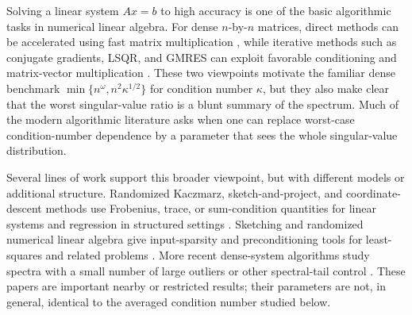 \documentclass[11pt]{article}
\begin{document}
Solving a linear system $Ax=b$ to high accuracy is one of the basic algorithmic
tasks in numerical linear algebra.  For dense $n$-by-$n$ matrices, direct
methods can be accelerated using fast matrix multiplication
\cite{Strassen1969GaussianElimination,BunchHopcroft1974FastMatrixInversion,AlmanEtAl2025MoreAsymmetry},
while iterative methods such as conjugate gradients, LSQR, and GMRES
\cite{HestenesStiefel1952ConjugateGradient,PaigeSaunders1982LSQR,SaadSchultz1986GMRES}
can exploit favorable conditioning and matrix-vector multiplication
\cite{GolubVanLoan2013MatrixComputations,LiesenStrakos2013Krylov}.  These two
viewpoints motivate the familiar dense benchmark
$\min\{n^\omega,n^2\kappa^{1/2}\}$ for condition number $\kappa$, but they also
make clear that the worst singular-value ratio is a blunt summary of the
spectrum.  Much of the modern algorithmic literature asks when one can replace
worst-case condition-number dependence by a parameter that sees the whole
singular-value distribution.

Several lines of work support this broader viewpoint, but with different
models or additional structure.  Randomized Kaczmarz, sketch-and-project, and
coordinate-descent methods use Frobenius, trace, or sum-condition quantities
for linear systems and regression in structured settings
\cite{StrohmerVershynin2009RandomizedKaczmarz,LeventhalLewis2010RandomizedConstraints,GowerRichtarik2015RandomizedIterative,LeeSidford2013AcceleratedCoordinateDescent,AgarwalEtAl2020LeverageScoreSampling}.
Sketching and randomized numerical linear algebra give input-sparsity and
preconditioning tools for least-squares and related problems
\cite{Sarlos2006RandomProjections,RokhlinTygert2008FastRandomizedLeastSquares,ClarksonWoodruff2017InputSparsity,HalkoMartinssonTropp2011FindingStructure,MartinssonTropp2020RandNLA}.
More recent dense-system algorithms study spectra with a small number of large
outliers or other spectral-tail control
\cite{DerezinskiYang2024DensePreconditioning,DerezinskiMuscoYang2025MultiLevel,DerezinskiLeJeuneNeedellRebrova2024FineGrained,DerezinskiNeedellRebrovaYang2025KaczmarzBeyondKrylov}.
These papers are important nearby or restricted results; their parameters are
not, in general, identical to the averaged condition number studied below.
\end{document}
